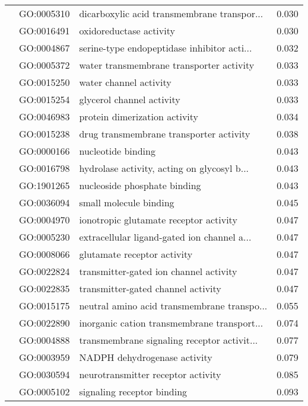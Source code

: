 \begin{longtable}{lllr}
   & GO:0005310 &  dicarboxylic acid transmembrane transpor... &         0.030 \\
   & GO:0016491 &                      oxidoreductase activity &         0.030 \\
   & GO:0004867 &  serine-type endopeptidase inhibitor acti... &         0.032 \\
   & GO:0005372 &     water transmembrane transporter activity &         0.033 \\
   & GO:0015250 &                       water channel activity &         0.033 \\
   & GO:0015254 &                    glycerol channel activity &         0.033 \\
   & GO:0046983 &                protein dimerization activity &         0.034 \\
   & GO:0015238 &      drug transmembrane transporter activity &         0.038 \\
   & GO:0000166 &                           nucleotide binding &         0.043 \\
   & GO:0016798 &  hydrolase activity, acting on glycosyl b... &         0.043 \\
   & GO:1901265 &                 nucleoside phosphate binding &         0.043 \\
   & GO:0036094 &                       small molecule binding &         0.045 \\
   & GO:0004970 &       ionotropic glutamate receptor activity &         0.047 \\
   & GO:0005230 &  extracellular ligand-gated ion channel a... &         0.047 \\
   & GO:0008066 &                  glutamate receptor activity &         0.047 \\
   & GO:0022824 &       transmitter-gated ion channel activity &         0.047 \\
   & GO:0022835 &           transmitter-gated channel activity &         0.047 \\
   & GO:0015175 &  neutral amino acid transmembrane transpo... &         0.055 \\
   & GO:0022890 &  inorganic cation transmembrane transport... &         0.074 \\
   & GO:0004888 &  transmembrane signaling receptor activit... &         0.077 \\
   & GO:0003959 &                 NADPH dehydrogenase activity &         0.079 \\
   & GO:0030594 &           neurotransmitter receptor activity &         0.085 \\
   & GO:0005102 &                   signaling receptor binding &         0.093 \\
\end{longtable}
